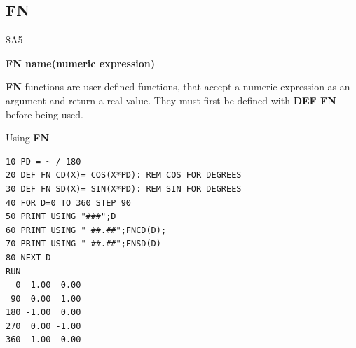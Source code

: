 
\newpage
\subsection{FN}
\begin{description}[leftmargin=2cm,style=nextline]
\item [Token:] \$A5
\item [Format:] {\bf FN name(numeric expression)}
\item [Usage:] {\bf FN} functions are user-defined
               functions, that accept a numeric expression as an
               argument and return a real value.
               They must first be defined with {\bf DEF FN} before
               being used.

\item [Example:] Using {\bf FN}
\begin{tcolorbox}[colback=black,coltext=white]
\verbatimfont{\codefont}
\begin{verbatim}
10 PD = ~ / 180
20 DEF FN CD(X)= COS(X*PD): REM COS FOR DEGREES
30 DEF FN SD(X)= SIN(X*PD): REM SIN FOR DEGREES
40 FOR D=0 TO 360 STEP 90
50 PRINT USING "###";D
60 PRINT USING " ##.##";FNCD(D);
70 PRINT USING " ##.##";FNSD(D)
80 NEXT D
RUN
  0  1.00  0.00
 90  0.00  1.00
180 -1.00  0.00
270  0.00 -1.00
360  1.00  0.00
\end{verbatim}
\end{tcolorbox}
\end{description}


\newpage
